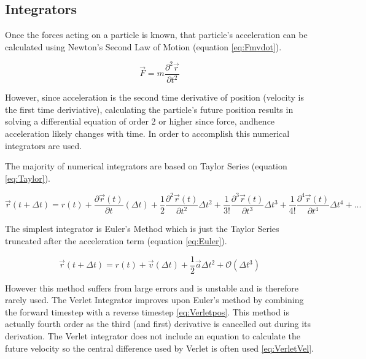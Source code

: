 \message{ !name(main.tex)}\documentclass[12pt]{UoAthesis}
\begin{document}
\subsection{Integrators} 
Once the forces acting on a particle is known, that particle's
acceleration can be calculated using Newton's Second Law of Motion
(equation \ref{eq:Fmvdot}).

\begin{equation} 
  \vec{F} = m \frac{\partial^2 \vec{r}}{\partial t^2}
  \label{eq:Fmvdot} 
\end{equation}

However, since acceleration is the second time derivative of position
(velocity is the first time deriviative), calculating the particle's
future position results in solving a differential equation of order 2
or higher since force, andhence acceleration likely changes with
time. In order to accomplish this numerical integrators are used.

The majority of numerical integrators are based on Taylor Series
(equation \ref{eq:Taylor}).

\begin{equation} 
\vec{r}(t+\Delta t) = r(t) + 
\frac{\partial\vec{r}(t)}{\partial t}(\Delta t) + 
\frac{1}{2}\frac{\partial^2\vec{r}(t)}{\partial t^2}\Delta t^2 + 
\frac{1}{3!}\frac{\partial^3\vec{r}(t)}{\partial t^3}\Delta t^3 
+ \frac{1}{4!}\frac{\partial^4\vec{r}(t)}{\partial t^4}\Delta t^4 
+ ... \label{eq:Taylor} 
\end{equation}

The simplest integrator is Euler's Method which is just the Taylor
Series truncated after the acceleration term (equation
\ref{eq:Euler}).

\begin{equation} 
  \vec{r}(t+\Delta t) = r(t) + \vec{v}(\Delta t) +
  \frac{1}{2}\vec{a}\Delta t^2 + \mathcal{O}(\Delta t^3) 
  \label{eq:Euler}
\end{equation}

However this method suffers from large errors and is unstable
\cite{Haile1997} and is therefore rarely used. The Verlet Integrator
\cite{Verlet1967} improves upon Euler's method by combining the
forward timestep with a reverse timestep \eqref{eq:Verletpos}. This
method is actually fourth order as the third (and first) derivative is
cancelled out during its derivation. The Verlet integrator does not
include an equation to calculate the future velocity so the central
difference used by Verlet is often used \eqref{eq:VerletVel}.
\end{document}
